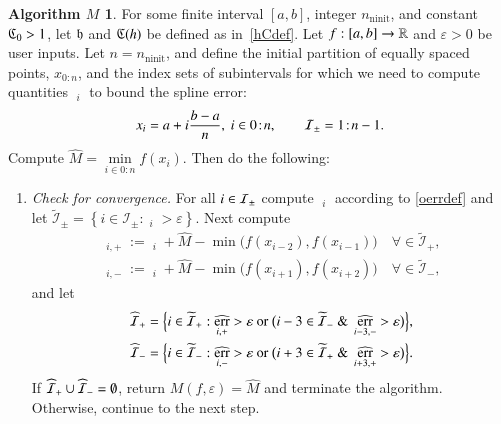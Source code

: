 \documentclass[review]{elsarticle}
\newcommand{\abstol}{\varepsilon}
\newcommand{\zton}{0\!:\!n}
\theoremstyle{definition}
\newtheorem*{algoM}{Algorithm $M$}
\newcommand{\hM}{\widehat{M}}
\DeclareMathOperator{\ninit}{ninit}
\DeclareMathOperator{\oerr}{\overline{err}}
\DeclareMathOperator{\herr}{\widehat{err}}
\newcommand{\minfi}{\min\limits_{i \in 0:n} f(x_i)} %
\begin{document}
\begin{algoM} \label{AlgoM}
	For some finite interval $[a,b]$, integer $n_{\ninit}$, and constant $\mathfrak{C}_0 > 1$, let 
	$\mathfrak{h}$ and $\mathfrak{C}(h)$ be defined as in~\eqref{hCdef}.  Let $f:[a,b] \to \mathbb{R}$ and 
	$\abstol >0$ be user inputs. Let
	$n=n_{\ninit}$, and define the initial partition of equally spaced points, $x_{0:n}$, and 
	the index sets of subintervals for which we need to compute quantities $\oerr_{i}$ to 
	bound the spline error:
\[
x_i=a+ i\frac{b-a}{n}, \ i \in \zton, \qquad \ci_{\pm} =  1\!:\!n-1.
\]
	Compute $\hM= \minfi$.  
	Then do the
	following:
	
	\begin{enumerate}[\em Step 1.]
		
		\item \label{stagemin1} \emph{Check for convergence.} For all $i \in \mathcal{I}_{\pm}$ 
		compute $\oerr_i $ according to \eqref{oerrdef} and let 
		$\widetilde{\mathcal{I}}_{\pm} = \left\{i \in \mathcal{I}_{\pm}: \oerr_i  
		> \abstol \right\}$.  Next compute
		\begin{gather*}
		\herr_{i,+} := \oerr_i + \hM - \min\bigl(f(x_{i - 2}),f(x_{i-1})\bigr) \quad 
		\forall \in \widetilde{\mathcal{I}}_{+}, \\
		\herr_{i,-} := \oerr_i + \hM - \min\bigl(f(x_{i +1}),f(x_{i+2})\bigr)  \quad 
		\forall \in \widetilde{\mathcal{I}}_{-},		
		\end{gather*}
		and let 
		\begin{gather*}
				\widehat{\ci}_+ = \Bigl\{i \in \widetilde{\ci}_+:  \herr_{i,+} > \abstol \text{ or } 
				\bigl( i-3 \in \widetilde{\ci}_- \text{ \& } \herr_{i-3,-} > \abstol \bigr) \Bigr\}, \\
				\widehat{\ci}_- = \Bigl\{i \in \widetilde{\ci}_-: \herr_{i,-} > \abstol \text{ or }
				\bigl( i+3\in \widetilde{\ci}_+ \text{ \& } \herr_{i+3,+} > \abstol \bigr) \Bigr\}.
		\end{gather*}
		If $\widehat{\mathcal{I}}_+ \cup \widehat{\mathcal{I}}_- =
		\emptyset$, return $M(f,\abstol) = \widehat{M}$ and terminate the algorithm.
		Otherwise, continue to the next step.
		

\end{enumerate}
\end{algoM}
\end{document}
